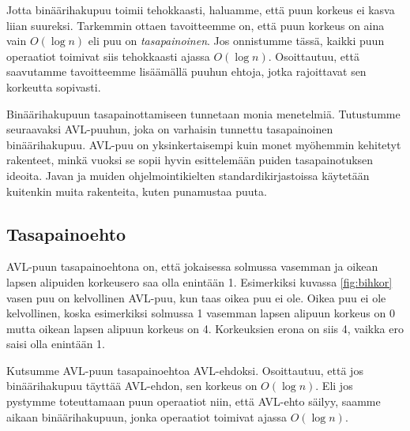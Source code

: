 Jotta binäärihakupuu toimii tehokkaasti, haluamme,
että puun korkeus ei kasva liian suureksi.
Tarkemmin ottaen tavoitteemme on, että puun korkeus on
aina vain $O(\log n)$ eli puu on \emph{tasapainoinen}.
Jos onnistumme tässä, kaikki puun operaatiot toimivat
siis tehokkaasti ajassa $O(\log n)$.
Osoittautuu, että saavutamme tavoitteemme
lisäämällä puuhun ehtoja, jotka rajoittavat
sen korkeutta sopivasti.

Binäärihakupuun tasapainottamiseen tunnetaan monia menetelmiä.
Tutustumme seuraavaksi AVL-puuhun, joka on 
varhaisin tunnettu tasapainoinen binäärihakupuu.
AVL-puu on yksinkertaisempi kuin monet myöhemmin
kehitetyt rakenteet, minkä vuoksi se sopii hyvin esittelemään
puiden tasapainotuksen ideoita.
Javan ja muiden ohjelmointikielten standardikirjastoissa
käyte\-tään kuitenkin muita rakenteita, kuten punamustaa puuta.

\subsection{Tasapainoehto}

AVL-puun tasapainoehtona on, että jokaisessa solmussa
vasemman ja oikean lapsen alipuiden korkeusero saa olla enintään 1.
Esimerkiksi kuvassa \ref{fig:bihkor} vasen puu on kelvollinen
AVL-puu, kun taas oikea puu ei ole.
Oikea puu ei ole kelvollinen, koska esimerkiksi solmussa 1
vasemman lapsen alipuun korkeus on 0 mutta oikean lapsen
alipuun korkeus on 4.
Korkeuksien erona on siis 4, vaikka ero saisi olla enintään 1.

Kutsumme AVL-puun tasapainoehtoa AVL-ehdoksi.
Osoittautuu, että jos binäärihakupuu täyttää AVL-ehdon,
sen korkeus on $O(\log n)$.
Eli jos pystymme toteuttamaan puun operaatiot niin,
että AVL-ehto säilyy, saamme aikaan binäärihakupuun,
jonka operaatiot toimivat ajassa $O(\log n)$.

